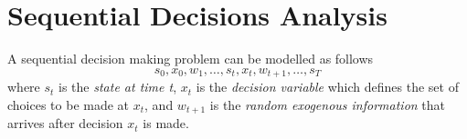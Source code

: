 
\section{Sequential Decisions Analysis}

\begin{definition}
    A sequential decision making problem can be modelled as follows 
    $$s_0,x_0,w_{1},\dots,s_t,x_t,w_{t+1},\dots,s_T$$
    where $s_t$ is the \textit{state at time t}, $x_t$ is the \textit{decision variable} which defines the set of choices to be made at $x_t$, and $w_{t+1}$ is the \textit{random exogenous information} that arrives after decision $x_t$ is made.
\end{definition}